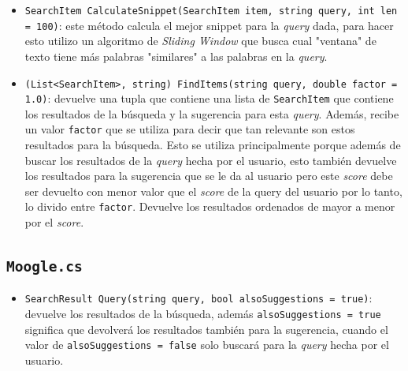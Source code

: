 \documentclass[a4paper, 12pt]{report}
\begin{document}
\begin{itemize}
	\item {\tt SearchItem CalculateSnippet(SearchItem item, string query, int len = 100)}: este m\'etodo calcula el mejor snippet para la {\it query} dada, para hacer esto utilizo un algoritmo de {\it Sliding Window} que busca cual "ventana" de texto tiene m\'as palabras "similares" a las palabras en la {\it query}.
	\item {\tt (List<SearchItem>, string) FindItems(string query, double factor = 1.0)}: devuelve una tupla que contiene una lista de {\tt SearchItem} que contiene los resultados de la b\'usqueda y la sugerencia para esta {\it query}. Adem\'as, recibe un valor {\tt factor} que se utiliza para decir que tan relevante son estos resultados para la b\'usqueda. Esto se utiliza principalmente porque adem\'as de buscar los resultados de la {\it query} hecha por el usuario, esto tambi\'en devuelve los resultados para la sugerencia que se le da al usuario pero este {\it score} debe ser devuelto con menor valor que el {\it score} de la query del usuario por lo tanto, lo divido entre {\tt factor}. Devuelve los resultados ordenados de mayor a menor por el {\it score}.
\end{itemize}

\subsection*{\tt Moogle.cs}

\begin{itemize}
	\item {\tt SearchResult Query(string query, bool alsoSuggestions = true)}: devuelve los resultados de la b\'usqueda, adem\'as {\tt alsoSuggestions = true} significa que devolver\'a los resultados tambi\'en para la sugerencia, cuando el valor de {\tt alsoSuggestions = false} solo buscar\'a para la {\it query} hecha por el usuario.
\end{itemize}
\end{document}
